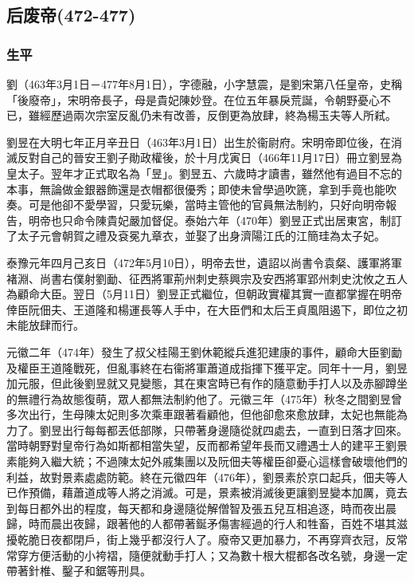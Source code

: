 
\subsection{后废帝\tiny(472-477)}

\subsubsection{生平}

劉（463年3月1日－477年8月1日），字德融，小字慧震，是劉宋第八任皇帝，史稱「後廢帝」，宋明帝長子，母是貴妃陳妙登。在位五年暴戾荒誕，令朝野憂心不已，雖經歷過兩次宗室反亂仍未有改善，反倒更為放肆，終為楊玉夫等人所弒。

劉昱在大明七年正月辛丑日（463年3月1日）出生於衞尉府。宋明帝即位後，在消滅反對自己的晉安王劉子勛政權後，於十月戊寅日（466年11月17日）冊立劉昱為皇太子。翌年才正式取名為「昱」。劉昱五、六歲時才讀書，雖然他有過目不忘的本事，無論做金銀器飾還是衣帽都很優秀；即使未曾學過吹篪，拿到手竟也能吹奏。可是他卻不愛學習，只愛玩樂，當時主管他的官員無法制約，只好向明帝報告，明帝也只命令陳貴妃嚴加督促。泰始六年（470年）劉昱正式出居東宮，制訂了太子元會朝賀之禮及袞冕九章衣，並娶了出身濟陽江氏的江簡珪為太子妃。

泰豫元年四月己亥日（472年5月10日），明帝去世，遺詔以尚書令袁粲、護軍將軍褚淵、尚書右僕射劉勔、征西將軍荊州刺史蔡興宗及安西將軍郢州刺史沈攸之五人為顧命大臣。翌日（5月11日）劉昱正式繼位，但朝政實權其實一直都掌握在明帝倖臣阮佃夫、王道隆和楊運長等人手中，在大臣們和太后王貞風阻遏下，即位之初未能放肆而行。

元徽二年（474年）發生了叔父桂陽王劉休範縱兵進犯建康的事件，顧命大臣劉勔及權臣王道隆戰死，但亂事終在右衞將軍蕭道成指揮下獲平定。同年十一月，劉昱加元服，但此後劉昱就又見變態，其在東宮時已有作的隨意動手打人以及赤腳蹲坐的無禮行為故態復萌，眾人都無法制約他了。元徽三年（475年）秋冬之間劉昱曾多次出行，生母陳太妃則多次乘車跟著看顧他，但他卻愈來愈放肆，太妃也無能為力了。劉昱出行每每都丟低部隊，只帶著身邊隨從就四處去，一直到日落才回來。當時朝野對皇帝行為如斯都相當失望，反而都希望年長而又禮遇士人的建平王劉景素能夠入繼大統；不過陳太妃外戚集團以及阮佃夫等權臣卻憂心這樣會破壞他們的利益，故對景素處處防範。終在元徽四年（476年），劉景素於京口起兵，佃夫等人已作預備，藉蕭道成等人將之消滅。可是，景素被消滅後更讓劉昱變本加厲，竟去到每日都外出的程度，每天都和身邊隨從解僧智及張五兒互相追逐，時而夜出晨歸，時而晨出夜歸，跟著他的人都帶著鋋矛傷害經過的行人和牲畜，百姓不堪其滋擾乾脆日夜都閉戶，街上幾乎都沒行人了。廢帝又更加暴力，不再穿齊衣冠，反常常穿方便活動的小袴褶，隨便就動手打人；又為數十根大棍都各改名號，身邊一定帶著針椎、鑿子和鋸等刑具。

